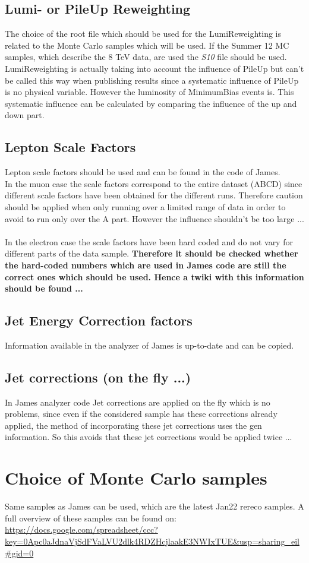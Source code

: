 \subsection{Lumi- or PileUp Reweighting}
The choice of the root file which should be used for the LumiReweighting is related to the Monte Carlo samples which will be used. If the Summer 12 MC samples, which describe the 8 TeV data, are used the \textit{S10} file should be used.\\
LumiReweighting is actually taking into account the influence of PileUp but can't be called this way when publishing results since a systematic influence of PileUp is no physical variable. However the luminosity of MinimumBias events is. This systematic influence can be calculated by comparing the influence of the up and down part.

\subsection{Lepton Scale Factors}
Lepton scale factors should be used and can be found in the code of James.\\
In the muon case the scale factors correspond to the entire dataset (ABCD) since different scale factors have been obtained for the different runs. Therefore caution should be applied when only running over a limited range of data in order to avoid to run only over the A part. However the influence shouldn't be too large ...\\
\\
In the electron case the scale factors have been hard coded and do not vary for different parts of the data sample. \textbf{Therefore it should be checked whether the hard-coded numbers which are used in James code are still the correct ones which should be used. Hence a twiki with this information should be found ...}

\subsection{Jet Energy Correction factors}
Information available in the analyzer of James is up-to-date and can be copied.


\subsection{Jet corrections (on the fly ...)}
In James analyzer code Jet corrections are applied on the fly which is no problems, since even if the considered sample has these corrections already applied, the method of incorporating these jet corrections uses the gen information. So this avoids that these jet corrections would be applied twice ...

\section{Choice of Monte Carlo samples}
Same samples as James can be used, which are the latest Jan22 rereco samples. A full overview of these samples can be found on:
\url{https://docs.google.com/spreadsheet/ccc?key=0Apc0aJdnaVjSdFVaLVU2dlk4RDZHcjlaakE3NWIxTUE&usp=sharing_eil#gid=0}
